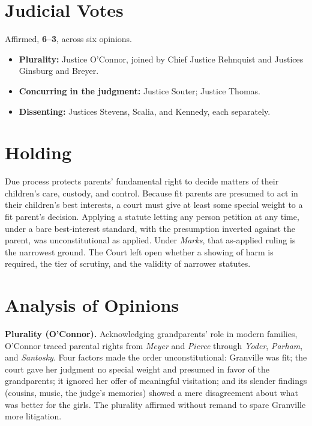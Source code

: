 \documentclass[12pt]{article}
\begin{document}
\section{Judicial Votes}

Affirmed, \textbf{6--3}, across six opinions.
\begin{itemize}
\item \textbf{Plurality:} Justice O'Connor, joined by Chief Justice Rehnquist and Justices Ginsburg and Breyer.
\item \textbf{Concurring in the judgment:} Justice Souter; Justice Thomas.
\item \textbf{Dissenting:} Justices Stevens, Scalia, and Kennedy, each separately.
\end{itemize}

\section{Holding}

Due process protects parents' fundamental right to decide matters of their children's care, custody, and control. Because fit parents are presumed to act in their children's best interests, a court must give at least some special weight to a fit parent's decision. Applying a statute letting any person petition at any time, under a bare best-interest standard, with the presumption inverted against the parent, was unconstitutional as applied. Under \textit{Marks}, that as-applied ruling is the narrowest ground. The Court left open whether a showing of harm is required, the tier of scrutiny, and the validity of narrower statutes.

\section{Analysis of Opinions}

\textbf{Plurality (O'Connor).} Acknowledging grandparents' role in modern families, O'Connor traced parental rights from \textit{Meyer} and \textit{Pierce} through \textit{Yoder}, \textit{Parham}, and \textit{Santosky}. Four factors made the order unconstitutional: Granville was fit; the court gave her judgment no special weight and presumed in favor of the grandparents; it ignored her offer of meaningful visitation; and its slender findings (cousins, music, the judge's memories) showed a mere disagreement about what was better for the girls. The plurality affirmed without remand to spare Granville more litigation.
\end{document}
